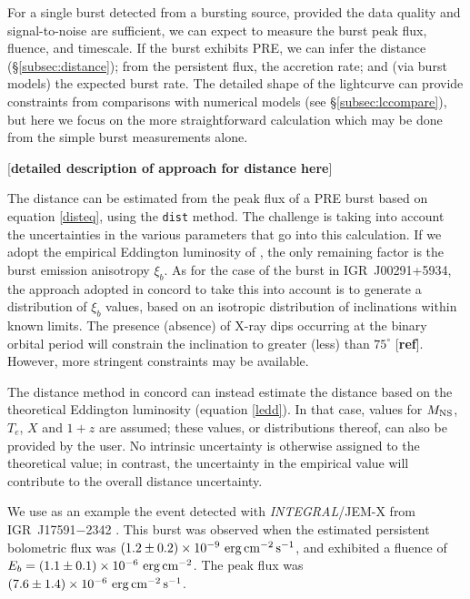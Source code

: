 \documentclass{aastex63}
\newcommand{\epcs}{{\rm erg\,cm^{-2}\,s^{-1}}}
\newcommand{\igr}{{\it INTEGRAL}}
\begin{document}

For a single burst detected from a bursting source, provided the data quality and signal-to-noise are sufficient, we can expect to measure the burst peak flux, fluence, and timescale. If the burst exhibits PRE, we can infer the distance (\S\ref{subsec:distance}); from the persistent flux, the accretion rate; and (via burst models) the expected burst rate. The detailed shape of the lightcurve can provide constraints from comparisons with numerical models (see \S\ref{subsec:lccompare}), but here we focus on the more straightforward calculation which may be done from the simple burst measurements alone. 

[{\bf detailed description of approach for distance here}]

The distance can be estimated from the peak flux of a PRE burst based on equation \ref{disteq}, using the {\tt dist} method. The challenge is taking into account the uncertainties in the various parameters that go into this calculation. If we adopt the empirical Eddington luminosity of \cite[]{kuul03a}, the only remaining factor is the burst emission anisotropy $\xi_b$.
%
As for the case of the burst in IGR~J00291+5934, the approach adopted in {\sc concord} to take this into account is to generate a distribution of $\xi_b$ values, based on an isotropic distribution of inclinations within known limits. The presence (absence) of X-ray dips occurring at the binary orbital period will constrain the inclination to greater (less) than $75^\circ$ [{\bf ref}]. However, more stringent constraints may be available.

The distance method in {\sc concord} can instead estimate the distance based on the theoretical Eddington luminosity (equation \ref{ledd}). In that case, values for $M_{\rm NS}$, $T_e$, $X$ and $1+z$ are assumed; these values, or distributions thereof, can also be provided by the user. No intrinsic uncertainty is otherwise assigned to the theoretical value; in contrast, the uncertainty in the empirical value will contribute to the overall distance uncertainty.


We use as an example 
the event detected with \igr/JEM-X from IGR~J17591$-$2342 \cite[]{kuiper20}. This burst was observed  when the estimated persistent bolometric flux was $(1.2\pm0.2)\times10^{-9}\ \epcs$, and exhibited a fluence of $E_b =(1.1\pm0.1)\times10^{-6}\ {\rm erg\,cm^{-2}}$. The peak flux was $(7.6\pm1.4)\times10^{-6}\ \epcs$.
\end{document}
